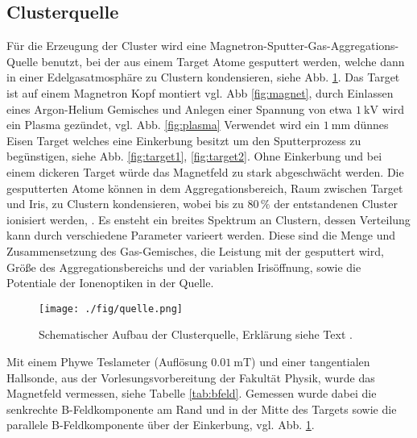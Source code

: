 \subsection{Clusterquelle}
Für die Erzeugung der Cluster wird eine Magnetron-Sputter-Gas-Aggregations-Quelle benutzt, bei der aus einem Target Atome gesputtert werden, welche dann in einer Edelgasatmosphäre zu Clustern kondensieren, siehe Abb. \ref{fig:quelle}.
Das Target ist auf einem Magnetron Kopf montiert vgl. Abb \ref{fig:magnet}, durch Einlassen eines Argon-Helium Gemisches und Anlegen einer Spannung von etwa $\SI{1}{\kV}$ wird ein Plasma gezündet, vgl. Abb. \ref{fig:plasma}
Verwendet wird ein $\SI{1}{\mm}$ dünnes Eisen Target welches eine Einkerbung besitzt um den Sputterprozess zu begünstigen, siehe Abb. \ref{fig:target1}, \ref{fig:target2}.
Ohne Einkerbung und bei einem dickeren Target würde das Magnetfeld zu stark abgeschwächt werden.
Die gesputterten Atome können in dem Aggregationsbereich, Raum zwischen Target und Iris, zu Clustern kondensieren, wobei bis zu $80\,\%$ der entstandenen Cluster ionisiert werden, \cite{Haberland.1991}.
Es ensteht ein breites Spektrum an Clustern, dessen Verteilung kann durch verschiedene Parameter varieert werden.
Diese sind die Menge und Zusammensetzung des Gas-Gemisches, die Leistung mit der gesputtert wird, Größe des Aggregationsbereichs und der variablen Irisöffnung, sowie die Potentiale der Ionenoptiken in der Quelle.
\begin{figure}
    \centering
    \texttt{[image: ./fig/quelle.png]}
    \caption{Schematischer Aufbau der Clusterquelle, Erklärung siehe Text \cite{woltermaster}.}
    \label{fig:quelle}
\end{figure}
Mit einem Phywe Teslameter (Auflösung $\SI{0,01}{\milli\tesla}$) und einer tangentialen Hallsonde, aus der Vorlesungsvorbereitung der Fakultät Physik, wurde das Magnetfeld vermessen, siehe Tabelle \ref{tab:bfeld}. %
Gemessen wurde dabei die senkrechte B-Feldkomponente am Rand und in der Mitte des Targets sowie die parallele B-Feldkomponente über der Einkerbung, vgl. Abb. \ref{fig:quelle}. 
